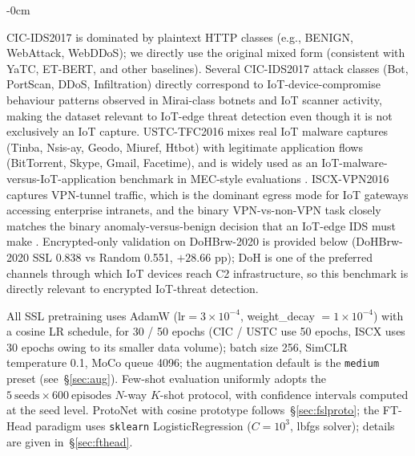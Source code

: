 \documentclass[sensors,article,submit,moreauthors]{Definitions/mdpi}
\begin{document}
\begin{table}[H]
\small
\caption{Datasets.}
\label{tab:datasets}
\begin{adjustwidth}{-\extralength}{0cm}
\end{adjustwidth}
\end{table}

CIC-IDS2017 is dominated by plaintext HTTP classes (e.g., BENIGN, WebAttack, WebDDoS); we directly use the original mixed form (consistent with YaTC, ET-BERT, and other baselines). Several CIC-IDS2017 attack classes (Bot, PortScan, DDoS, Infiltration) directly correspond to IoT-device-compromise behaviour patterns observed in Mirai-class botnets and IoT scanner activity, making the dataset relevant to IoT-edge threat detection even though it is not exclusively an IoT capture. USTC-TFC2016 mixes real IoT malware captures (Tinba, Nsis-ay, Geodo, Miuref, Htbot) with legitimate application flows (BitTorrent, Skype, Gmail, Facetime), and is widely used as an IoT-malware-versus-IoT-application benchmark in MEC-style evaluations \cite{lu2026cdtf}. ISCX-VPN2016 captures VPN-tunnel traffic, which is the dominant egress mode for IoT gateways accessing enterprise intranets, and the binary VPN-vs-non-VPN task closely matches the binary anomaly-versus-benign decision that an IoT-edge IDS must make \cite{liu2025iot}. Encrypted-only validation on DoHBrw-2020 is provided below (DoHBrw-2020 SSL 0.838 vs Random 0.551, $+28.66$ pp); DoH is one of the preferred channels through which IoT devices reach C2 infrastructure, so this benchmark is directly relevant to encrypted IoT-threat detection.

All SSL pretraining uses AdamW ($\text{lr} = 3 \times 10^{-4}$, weight\_decay $= 1 \times 10^{-4}$) with a cosine LR schedule, for 30 / 50 epochs (CIC / USTC use 50 epochs, ISCX uses 30 epochs owing to its smaller data volume); batch size 256, SimCLR temperature 0.1, MoCo queue 4096; the augmentation default is the \texttt{medium} preset (see~\S\ref{sec:aug}). Few-shot evaluation uniformly adopts the $5\ \text{seeds} \times 600\ \text{episodes}$ $N$-way $K$-shot protocol, with confidence intervals computed at the seed level. ProtoNet with cosine prototype follows~\S\ref{sec:fslproto}; the FT-Head paradigm uses \texttt{sklearn} LogisticRegression ($C = 10^3$, lbfgs solver); details are given in~\S\ref{sec:fthead}.
\end{document}
